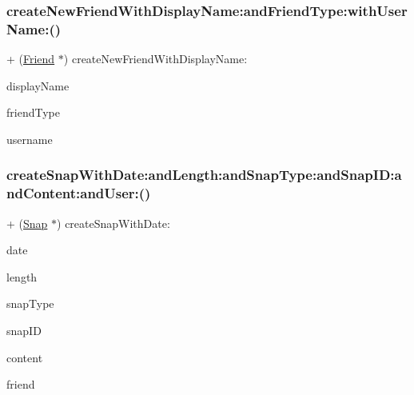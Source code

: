 \subsubsection{\texorpdfstring{create\+New\+Friend\+With\+Display\+Name\+:and\+Friend\+Type\+:with\+User\+Name\+:()}{createNewFriendWithDisplayName:andFriendType:withUserName:()}}
{\footnotesize\ttfamily + (\hyperlink{interface_friend}{Friend} $\ast$) create\+New\+Friend\+With\+Display\+Name\+: \begin{DoxyParamCaption}\item[{(N\+S\+String $\ast$)}]{display\+Name }\item[{andFriendType:(int)}]{friend\+Type }\item[{withUserName:(N\+S\+String $\ast$)}]{username }\end{DoxyParamCaption}}

\hypertarget{interface_snap_create_a2d6a6bced913823c8a36496f8522a746}{}\label{interface_snap_create_a2d6a6bced913823c8a36496f8522a746} 
\subsubsection{\texorpdfstring{create\+Snap\+With\+Date\+:and\+Length\+:and\+Snap\+Type\+:and\+Snap\+I\+D\+:and\+Content\+:and\+User\+:()}{createSnapWithDate:andLength:andSnapType:andSnapID:andContent:andUser:()}}
{\footnotesize\ttfamily + (\hyperlink{interface_snap}{Snap} $\ast$) create\+Snap\+With\+Date\+: \begin{DoxyParamCaption}\item[{(N\+S\+Date $\ast$)}]{date }\item[{andLength:(float)}]{length }\item[{andSnapType:(int)}]{snap\+Type }\item[{andSnapID:(N\+S\+String $\ast$)}]{snap\+ID }\item[{andContent:(nonnull \hyperlink{interface_content}{Content} $\ast$)}]{content }\item[{andUser:(nonnull \hyperlink{interface_friend}{Friend} $\ast$)}]{friend }\end{DoxyParamCaption}}

